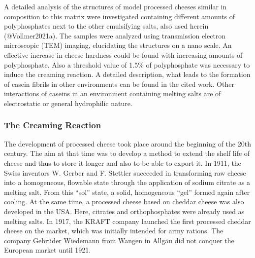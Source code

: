 \documentclass[
]{article}
\begin{document}
A detailed analysis of the structures of model processed cheeses similar
in composition to this matrix were investigated containing different
amounts of polyphosphates next to the other emulsifying salts, also used
herein (@Vollmer2021a). The samples were analyzed using transmission
electron microscopic (TEM) imaging, elucidating the structures on a nano
scale. An effective increase in cheese hardness could be found with
increasing amounts of polyphosphate. Also a threshold value of 1.5\% of
polyphosphate was necessary to induce the creaming reaction. A detailed
description, what leads to the formation of casein fibrils in other
environments can be found in the cited work. Other interactions of
caseins in an environment containing melting salts are of electrostatic
or general hydrophilic nature.

\subsubsection{The Creaming Reaction}

The development of processed cheese took place around the beginning of
the 20th century. The aim at that time was to develop a method to extend
the shelf life of cheese and thus to store it longer and also to be able
to export it. In 1911, the Swiss inventors W. Gerber and F. Stettler
succeeded in transforming raw cheese into a homogeneous, flowable state
through the application of sodium citrate as a melting salt. From this
``sol'' state, a solid, homogeneous ``gel'' formed again after cooling.
At the same time, a processed cheese based on cheddar cheese was also
developed in the USA. Here, citrates and orthophosphates were already
used as melting salts. In 1917, the KRAFT company launched the first
processed cheddar cheese on the market, which was initially intended for
army rations. The company Gebrüder Wiedemann from Wangen in Allgäu did
not conquer the European market until 1921.
\end{document}
